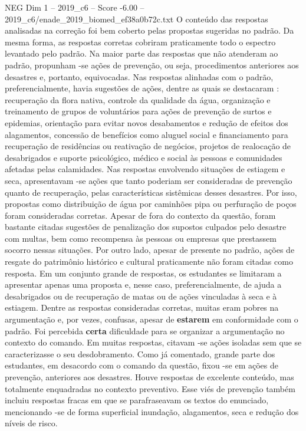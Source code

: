 \begin{textsample}{NEG Dim 1 – 2019\_c6 – Score -6.00 – 2019\_c6/enade\_2019\_biomed\_ef38a0b72c.txt}
O conteúdo das respostas analisadas na correção foi bem coberto pelas propostas sugeridas no padrão.
Da mesma forma, as respostas corretas cobriram praticamente todo o espectro levantado pelo padrão.
Na maior parte das respostas que não atenderam ao padrão, propunham -se ações de prevenção, ou seja, procedimentos anteriores aos desastres e, portanto, equivocadas.
Nas respostas alinhadas com o padrão, preferencialmente, havia sugestões de ações, dentre as quais se destacaram : recuperação da flora nativa, controle da qualidade da água, organização e treinamento de grupos de voluntários para ações de prevenção de surtos e epidemias, orientação para evitar novos desabamentos e redução de efeitos dos alagamentos, concessão de benefícios como aluguel social e financiamento para recuperação de residências ou reativação de negócios, projetos de realocação de desabrigados e suporte psicológico, médico e social às pessoas e comunidades afetadas pelas calamidades.
Nas respostas envolvendo situações de estiagem e seca, apresentavam -se ações que tanto poderiam ser consideradas de prevenção quanto de recuperação, pelas características sistêmicas desses desastres.
Por isso, propostas como distribuição de água por caminhões pipa ou perfuração de poços foram consideradas corretas.
Apesar de fora do contexto da questão, foram bastante citadas sugestões de penalização dos supostos culpados pelo desastre com multas, bem como recompensa às pessoas ou empresas que prestassem socorro nessas situações.
Por outro lado, apesar de presente no padrão, ações de resgate do patrimônio histórico e cultural praticamente não foram citadas como resposta.
Em um conjunto grande de respostas, os estudantes se limitaram a apresentar apenas uma proposta e, nesse caso, preferencialmente, de ajuda a desabrigados ou de recuperação de matas ou de ações vinculadas à seca e à estiagem.
Dentre as respostas consideradas corretas, muitas eram pobres na argumentação e, por vezes, confusas, apesar de \textbf{estarem} em conformidade com o padrão.
Foi percebida \textbf{certa} dificuldade para se organizar a argumentação no contexto do comando.
Em muitas respostas, citavam -se ações isoladas sem que se caracterizasse o seu desdobramento.
Como já comentado, grande parte dos estudantes, em desacordo com o comando da questão, fixou -se em ações de prevenção, anteriores aos desastres.
Houve respostas de excelente conteúdo, mas totalmente enquadradas no contexto preventivo.
Esse viés de prevenção também incluiu respostas fracas em que se parafraseavam os textos do enunciado, mencionando -se de forma superficial inundação, alagamentos, seca e redução dos níveis de risco.

\end{textsample}
